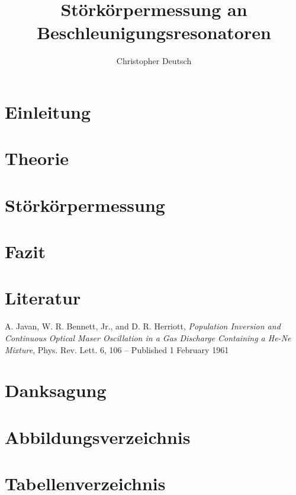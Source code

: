 \documentclass[11pt, a4paper]{scrbook}
\title{Störkörpermessung an Beschleunigungsresonatoren}
\author{Christopher Deutsch}
\begin{document}
	\frontmatter
	\maketitle
	\tableofcontents
	
	\mainmatter
	
	\chapter{Einleitung}
	
	\chapter{Theorie}
	
	\chapter{Störkörpermessung}
	
	\chapter{Fazit}
	
	\backmatter
	
	\chapter{Literatur}
	
	\begin{thebibliography}{19}
		A. Javan, W. R. Bennett, Jr., and D. R. Herriott,
		\emph{Population Inversion and Continuous Optical Maser Oscillation in a Gas Discharge Containing a He-Ne Mixture},
		Phys. Rev. Lett. 6, 106 – Published 1 February 1961
	
	\end{thebibliography}
	
	\chapter{Danksagung}
	
	\chapter{Abbildungsverzeichnis}
	\listoffigures
	
	\chapter{Tabellenverzeichnis}
	\listoftables
	
\end{document}
